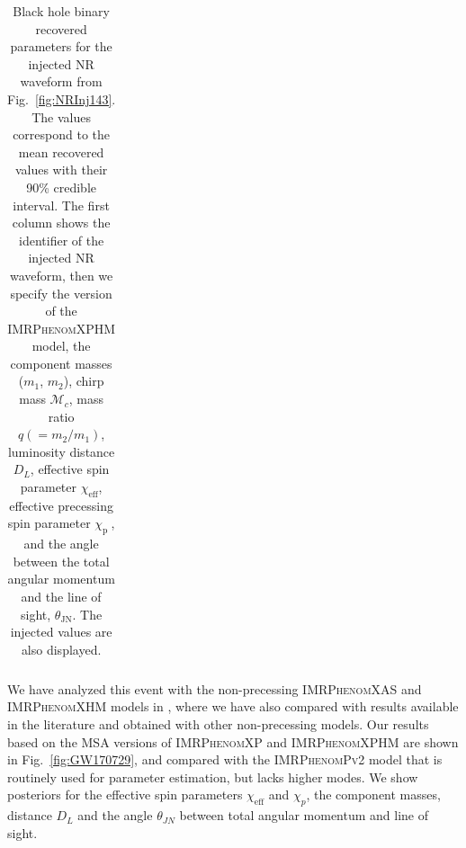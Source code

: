 \documentclass[%
aps,
prd,
amssymb,
amsmath,
amsfonts,
eqsecnum,
showpacs,
nofootinbib,
floatfix,
twocolumn,
twoside,
a4paper,
superscriptaddress
]{revtex4-1}
\newcommand{\phX}{\textsc{IMRPhenomXAS}\xspace}
\newcommand{\phPvtwo}{\textsc{IMRPhenomPv2}\xspace}
\newcommand{\phXHM}{\textsc{IMRPhenomXHM}\xspace}
\newcommand{\phXP}{\textsc{IMRPhenomXP}\xspace}
\newcommand{\phXPHM}{\textsc{IMRPhenomXPHM}\xspace}
\begin{document}
\begin{table}[bhpt]
\begin{center}
\begin{tabular}{  c   c   c   c   c  c  c  c   c  c c   }
   
   
\hline
\hline
 \end{tabular}
\end{center}
\caption{Black hole binary recovered parameters for the injected NR waveform from
Fig.~\ref{fig:NRInj143}.
The values correspond to the mean recovered values with their 90\% credible interval. The first column shows the identifier of the injected NR waveform, then we specify the version of the \phXPHM model, the component masses ($m_1$, $m_2$), chirp mass $\mathcal{M}_c$, mass ratio $q(=m_2/m_1)$, luminosity distance $D_L$, effective spin parameter $\chi_{\text{eff}}$, effective precessing spin parameter  $\chi_{\text{p }}$, and the angle between the total angular momentum and the line of sight, $\theta_{\text{JN}}$. %
The injected values are also displayed.}
\label{tab:tabInj}
\end{table}

We have analyzed this event with the non-precessing \phX and \phXHM models in \cite{Garcia-Quiros:2020qpx}, where we have also compared with results available in the literature and obtained with other non-precessing models. Our results based
on the MSA versions of \phXP and \phXPHM are shown in Fig.~\ref{fig:GW170729}, and compared with the \phPvtwo model that is routinely used for parameter estimation, but lacks higher modes.
We show posteriors for the effective spin parameters $\chi_\mathrm{eff}$ and $\chi_p$, the component masses, distance $D_L$ and the angle $\theta_{JN}$ between total angular momentum and line of sight.
\end{document}
